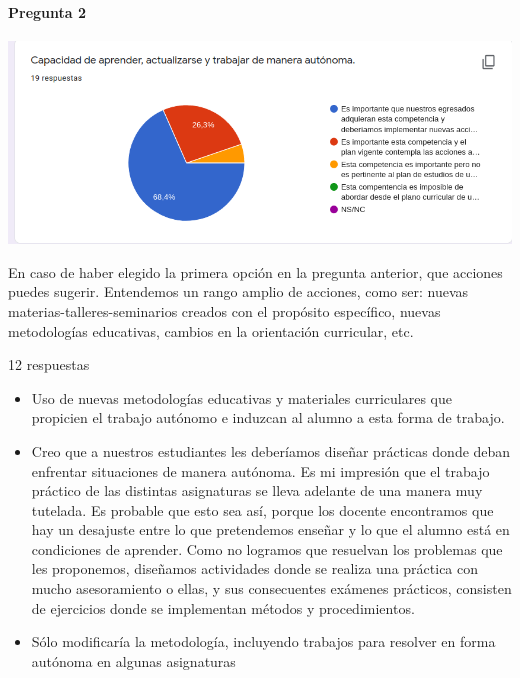 \documentclass[a4paper,10pt,BCOR10mm,oneside,headsepline]{scrbook}
\begin{document}
\begin{subappendices}
\begin{itemize}
\end{itemize}




\paragraph{Pregunta 2}
\begin{center}
 
\includegraphics[scale=.9]{doc02.png}
 \end{center}

 En caso de haber elegido la primera opción en la pregunta anterior, que acciones puedes sugerir. Entendemos un rango amplio de acciones, como ser: nuevas materias-talleres-seminarios creados con el propósito específico, nuevas metodologías educativas, cambios en la orientación curricular, etc. 
 
 12 respuestas

 \begin{itemize}
 \item Uso de nuevas metodologías educativas y materiales curriculares que propicien el trabajo autónomo e induzcan al alumno a esta forma de trabajo.
 
\item Creo que a nuestros estudiantes les deberíamos diseñar prácticas donde deban  enfrentar situaciones de manera autónoma. Es mi impresión que el trabajo práctico de las distintas asignaturas se lleva adelante de una manera muy tutelada.  Es probable que esto sea así, porque los docente encontramos que hay un desajuste entre lo que pretendemos enseñar y lo que el alumno está en condiciones de aprender. Como no logramos que resuelvan los problemas que les proponemos, diseñamos actividades donde se realiza una práctica con mucho asesoramiento o ellas, y sus consecuentes exámenes prácticos, consisten de ejercicios donde se implementan métodos y procedimientos.  

\item Sólo modificaría la metodología, incluyendo trabajos para resolver en forma autónoma en algunas asignaturas  


\end{itemize}
\end{subappendices}
\end{document}

